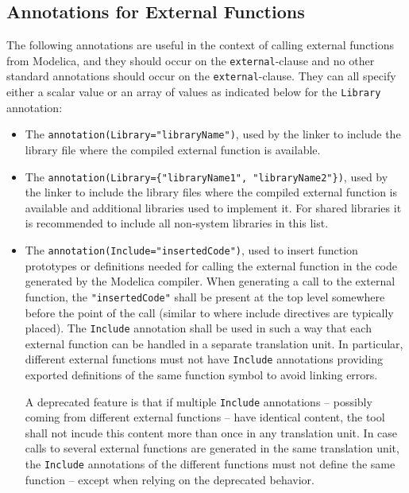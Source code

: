 \subsection{Annotations for External Functions}\label{annotations-for-external-libraries-and-include-files}

The following annotations are useful in the context of calling external functions from Modelica, and they should occur on the {\lstinline!external!}-clause and no other standard annotations should occur on the {\lstinline!external!}-clause.
They can all specify either a scalar value or an array of values as indicated below for the {\lstinline!Library!} annotation:
\begin{itemize}
\item
  The {\lstinline!annotation(Library="libraryName")!}, used by the linker to include the library file where the compiled external function is available.
\item
  The {\lstinline!annotation(Library={"libraryName1", "libraryName2"})!}, used by the linker to include the library files where the compiled external function is available and additional libraries used to implement it.
  For shared libraries it is recommended to include all non-system libraries in this list.
\item
  The {\lstinline!annotation(Include="insertedCode")!}, used to insert function prototypes or definitions needed for calling the external function in the code generated by the Modelica compiler.
  When generating a call to the external function, the \lstinline!"insertedCode"! shall be present at the top level somewhere before the point of the call (similar to where include directives are typically placed).
  The \lstinline!Include! annotation shall be used in such a way that each external function can be handled in a separate translation unit.
  In particular, different external functions must not have \lstinline!Include! annotations providing exported definitions of the same function symbol to avoid linking errors.

  A deprecated feature is that if multiple \lstinline!Include! annotations -- possibly coming from different external functions -- have identical content, the tool shall not incude this content more than once in any translation unit.
  In case calls to several external functions are generated in the same translation unit, the \lstinline!Include! annotations of the different functions must not define the same function -- except when relying on the deprecated behavior.


\end{itemize}

